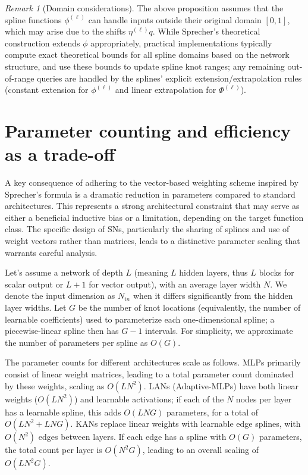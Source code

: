 \documentclass{article}
\theoremstyle{plain}
\theoremstyle{definition}
\theoremstyle{remark}
\newtheorem{remark}{Remark}
\begin{document}
\begin{remark}[Domain considerations]
The above proposition assumes that the spline functions $\phi^{(\ell)}$ can handle inputs outside their original domain $[0,1]$, which may arise due to the shifts $\eta^{(\ell)}q$. While Sprecher's theoretical construction extends $\phi$ appropriately, practical implementations typically compute exact theoretical bounds for all spline domains based on the network structure, and use these bounds to update spline knot ranges; any remaining out-of-range queries are handled by the splines' explicit extension/extrapolation rules (constant extension for $\phi^{(\ell)}$ and linear extrapolation for $\Phi^{(\ell)}$).
\end{remark}

\section{Parameter counting and efficiency as a trade-off}
A key consequence of adhering to the vector-based weighting scheme inspired by Sprecher's formula is a dramatic reduction in parameters compared to standard architectures. This represents a strong architectural constraint that may serve as either a beneficial inductive bias or a limitation, depending on the target function class. The specific design of SNs, particularly the sharing of splines and use of weight vectors rather than matrices, leads to a distinctive parameter scaling that warrants careful analysis.

Let's assume a network of depth $L$ (meaning $L$ hidden layers, thus $L$ blocks for scalar output or $L+1$ for vector output), with an average layer width $N$. We denote the input dimension as $N_{in}$ when it differs significantly from the hidden layer widths. Let $G$ be the number of knot locations (equivalently, the number of learnable coefficients) used to parameterize each one-dimensional spline; a piecewise-linear spline then has $G-1$ intervals. For simplicity, we approximate the number of parameters per spline as $O(G)$.

The parameter counts for different architectures scale as follows. MLPs primarily consist of linear weight matrices, leading to a total parameter count dominated by these weights, scaling as $O(L N^2)$. LANs (Adaptive-MLPs) have both linear weights ($O(L N^2)$) and learnable activations; if each of the $N$ nodes per layer has a learnable spline, this adds $O(L N G)$ parameters, for a total of $O(L N^2 + L N G)$. KANs replace linear weights with learnable edge splines, with $O(N^2)$ edges between layers. If each edge has a spline with $O(G)$ parameters, the total count per layer is $O(N^2 G)$, leading to an overall scaling of $O(L N^2 G)$.
\end{document}
